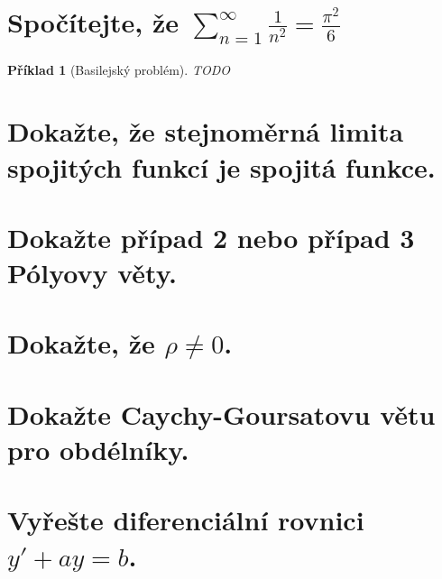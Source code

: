 \documentclass[11pt]{article}
\theoremstyle{nontheoremstyle}
\newtheorem*{example}{Příklad}
\theoremstyle{nontheoremstylenodot}
\theoremstyle{theoremstyle}
\begin{document}
\section{Spočítejte, že $ \sum_{n=1}^{\infty} \frac{1}{n^2} = \frac{\pi^2}{6} $}

\begin{example}[Basilejský problém]
    \LARGE
    TODO
\end{example}

\section{Dokažte, že stejnoměrná limita spojitých funkcí je spojitá funkce.}



\section{Dokažte případ 2 nebo případ 3 Pólyovy věty.}
\section{Dokažte, že $\rho \neq 0$.}
\section{Dokažte Caychy-Goursatovu větu pro obdélníky.}
\section{Vyřešte diferenciální rovnici $y' + ay = b$.}
\end{document}
